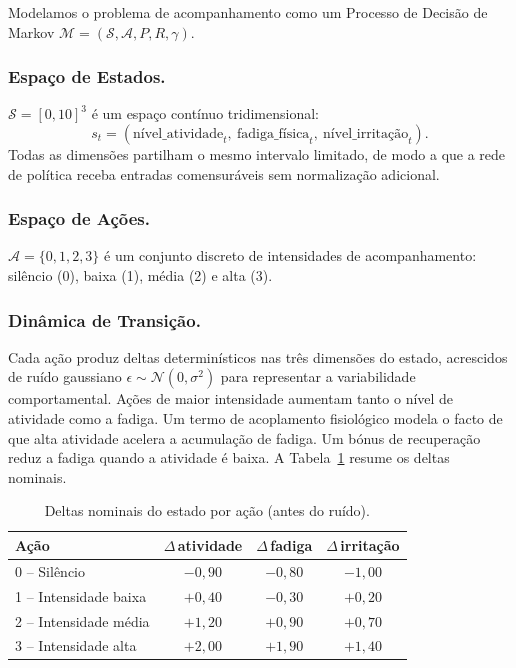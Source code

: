 \documentclass[runningheads]{llncs}
\begin{document}
Modelamos o problema de acompanhamento como um Processo de Decisão de Markov
$\mathcal{M} = (\mathcal{S}, \mathcal{A}, P, R, \gamma)$.

\subsubsection{Espaço de Estados.}
$\mathcal{S} = [0, 10]^3$ é um espaço contínuo tridimensional:
\begin{equation}
  s_t = (\text{n\'ivel\_atividade}_t,\ \text{fadiga\_f\'isica}_t,\
         \text{n\'ivel\_irrita\c{c}\~ao}_t).
\end{equation}
Todas as dimensões partilham o mesmo intervalo limitado, de modo a que a rede de
política receba entradas comensuráveis sem normalização adicional.

\subsubsection{Espaço de Ações.}
$\mathcal{A} = \{0, 1, 2, 3\}$ é um conjunto discreto de intensidades de
acompanhamento: silêncio (0), baixa (1), média (2) e alta (3).

\subsubsection{Dinâmica de Transição.}
Cada ação produz deltas determinísticos nas três dimensões do estado, acrescidos de
ruído gaussiano $\epsilon \sim \mathcal{N}(0, \sigma^2)$ para representar a
variabilidade comportamental. Ações de maior intensidade aumentam tanto o nível de
atividade como a fadiga. Um termo de acoplamento fisiológico modela o facto de que
alta atividade acelera a acumulação de fadiga. Um bónus de recuperação reduz a
fadiga quando a atividade é baixa. A Tabela~\ref{tab:dynamics} resume os deltas
nominais.

\begin{table}[h]
\caption{Deltas nominais do estado por ação (antes do ruído).}
\label{tab:dynamics}
\centering
\begin{tabular}{lccc}
\toprule
Ação & $\Delta$\,atividade & $\Delta$\,fadiga & $\Delta$\,irritação \\
\midrule
0 -- Silêncio        & $-0{,}90$ & $-0{,}80$ & $-1{,}00$ \\
1 -- Intensidade baixa  & $+0{,}40$ & $-0{,}30$ & $+0{,}20$ \\
2 -- Intensidade média  & $+1{,}20$ & $+0{,}90$ & $+0{,}70$ \\
3 -- Intensidade alta   & $+2{,}00$ & $+1{,}90$ & $+1{,}40$ \\
\bottomrule
\end{tabular}
\end{table}
\end{document}
